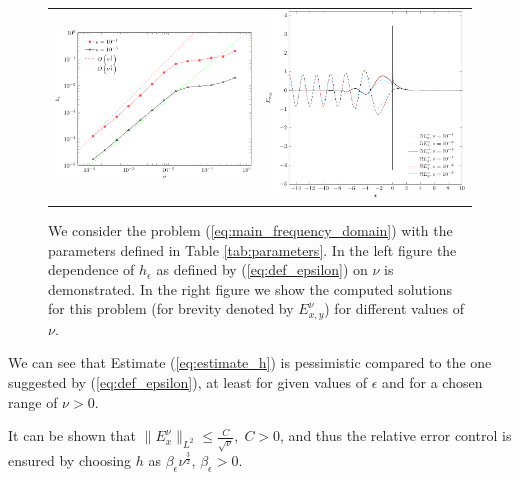 \begin{figure}
\begin{tabular}{cc}
\includegraphics[height=0.32\textwidth]{pics_frequency_domain/h_nu.pdf}
&
\includegraphics[height=0.32\textwidth]{pics_frequency_domain/res_sol.pdf}
\end{tabular}
\caption{We consider the problem (\ref{eq:main_frequency_domain}) with the parameters 
defined in Table \ref{tab:parameters}. In the left figure the dependence of $h_{\epsilon}$ as defined by (\ref{eq:def_epsilon}) on $\nu$ is demonstrated.  
In the right figure we show the computed solutions for this problem (for brevity denoted by $E_{x,y}^{\nu}$) for different values of $\nu$. }
\label{fig:dependence}
\end{figure}
We can see that Estimate (\ref{eq:estimate_h}) is pessimistic compared to the one suggested by (\ref{eq:def_epsilon}), 
at least for given values of $\epsilon$ and for a chosen range of $\nu>0$.
\begin{remark}
It can be shown that $\|E^{\nu}_{x}\|_{L^2}\leq \frac{C}{\sqrt{\nu}},\; C>0$, 
and thus the relative error control
\bealn
 \leq \epsilon
\eealn
 is ensured by choosing $h$ as $\beta_{\epsilon}\nu^{\frac{3}{2}}$, $\beta_{\epsilon}>0$.
\end{remark}

